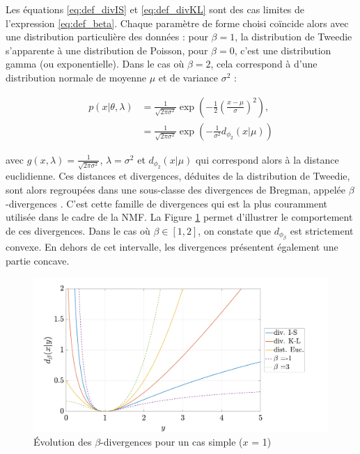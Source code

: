 Les équations \ref{eq:def_divIS} et \ref{eq:def_divKL} sont des cas limites de l'expression \ref{eq:def_beta}. Chaque paramètre de forme choisi coïncide alors avec une distribution particulière des données : pour $\beta = 1$, la distribution de Tweedie s'apparente à une distribution de Poisson, pour $\beta = 0$, c'est une distribution gamma (ou exponentielle). Dans le cas où $\beta = 2$, cela correspond à d'une distribution normale de moyenne $\mu$ et de variance $\sigma^2$ :

\begin{align}
p(x \vert \theta, \lambda) & = \frac{1}{\sqrt{2 \pi \sigma^2}}\exp\left(-\frac{1}{2} \left(\frac{x-\mu}{\sigma} \right)^2 \right),\\
& = \frac{1}{\sqrt{2 \pi \sigma^2}}\exp\left(-\frac{1}{\sigma^2}  d_{\phi_{2}}(x\vert \mu) \right)
\end{align}

avec $g(x,\lambda) = \frac{1}{\sqrt{2 \pi \sigma^2}}$, $\lambda = \sigma^2$ et $d_{\phi_{2}}(x\vert \mu)$ qui correspond alors à la distance euclidienne. Ces distances et divergences, déduites de la distribution de Tweedie, sont alors regroupées dans une sous-classe des divergences de Bregman, appelée $\beta$-divergences \cite{hennequin_beta-divergence_2011}. C'est cette famille de divergences qui est la plus couramment utilisée dans le cadre de la NMF. La Figure \ref{fig:allure-divergence} permet d'illustrer le comportement de ces divergences. Dans le cas où $\beta \in \left[ 1,2 \right]$, on constate que $d_{\phi_{\beta}}$ est strictement convexe. En dehors de cet intervalle, les divergences présentent également une partie concave. \\

\begin{figure}[h]
\centering
\includegraphics[width=.7\textwidth]{./figures/NMF/betaDiv_exemple.pdf}
\caption{Évolution des $\beta$-divergences pour un cas simple ($x$ = 1)}
\label{fig:allure-divergence}
\end{figure}

